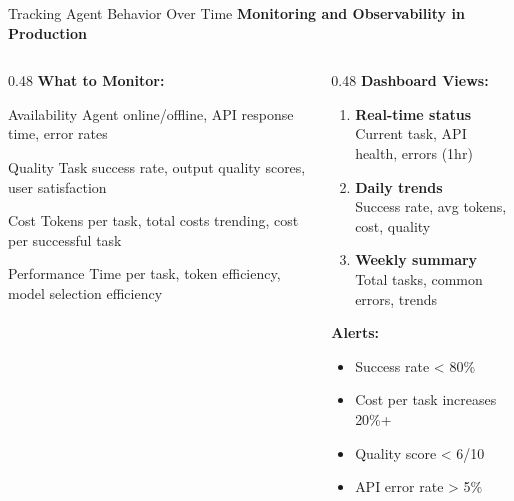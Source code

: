\documentclass[aspectratio=169,11pt]{beamer}
\begin{document}
\begin{frame}{Tracking Agent Behavior Over Time}
    \textbf{Monitoring and Observability in Production}

    \begin{columns}[T]
        \begin{column}{0.48\textwidth}
            \textbf{What to Monitor:}

            \begin{block}{Availability}
                Agent online/offline, API response time, error rates
            \end{block}

            \begin{block}{Quality}
                Task success rate, output quality scores, user satisfaction
            \end{block}

            \begin{block}{Cost}
                Tokens per task, total costs trending, cost per successful task
            \end{block}

            \begin{block}{Performance}
                Time per task, token efficiency, model selection efficiency
            \end{block}
        \end{column}
        \begin{column}{0.48\textwidth}
            \textbf{Dashboard Views:}
            \begin{enumerate}
                \item \textbf{Real-time status}\\
                Current task, API health, errors (1hr)

                \item \textbf{Daily trends}\\
                Success rate, avg tokens, cost, quality

                \item \textbf{Weekly summary}\\
                Total tasks, common errors, trends
            \end{enumerate}

            \vspace{0.3cm}
            \textbf{Alerts:}
            \begin{itemize}
                \item Success rate < 80\%
                \item Cost per task increases 20\%+
                \item Quality score < 6/10
                \item API error rate > 5\%
            \end{itemize}
        \end{column}
    \end{columns}
\end{frame}
\end{document}
